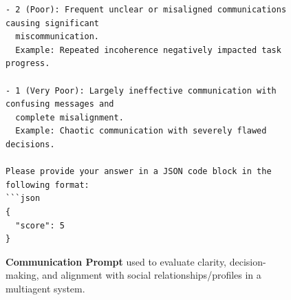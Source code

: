 \begin{figure}[htbp]
\begin{tcolorbox}[
    title=\textbf{Communication Evaluation Prompt},
    colback=green!1!white,
    colframe=green!50!black,
    fonttitle=\bfseries
]
\begin{verbatim}
- 2 (Poor): Frequent unclear or misaligned communications causing significant
  miscommunication.
  Example: Repeated incoherence negatively impacted task progress.

- 1 (Very Poor): Largely ineffective communication with confusing messages and
  complete misalignment.
  Example: Chaotic communication with severely flawed decisions.

Please provide your answer in a JSON code block in the following format:
```json
{
  "score": 5
}
\end{verbatim} 
\end{tcolorbox}

\caption{\textbf{Communication Prompt} used to evaluate clarity, decision-making, and alignment with social relationships/profiles in a multiagent system.} \label{fig:communication_prompt} \end{figure}




